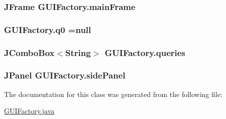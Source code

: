 \subsubsection[{\texorpdfstring{main\+Frame}{mainFrame}}]{\setlength{\rightskip}{0pt plus 5cm}J\+Frame G\+U\+I\+Factory.\+main\+Frame\hspace{0.3cm}{\ttfamily [private]}}\hypertarget{classGUIFactory_afb70d82da7ea373c87a3cb8c2f6eb075}{}\label{classGUIFactory_afb70d82da7ea373c87a3cb8c2f6eb075}
\subsubsection[{\texorpdfstring{q0}{q0}}]{ G\+U\+I\+Factory.\+q0 =null\hspace{0.3cm}{\ttfamily [private]}}\hypertarget{classGUIFactory_a6f1a7d65f7a410b4a47ce24164e1d594}{}\label{classGUIFactory_a6f1a7d65f7a410b4a47ce24164e1d594}
\subsubsection[{\texorpdfstring{queries}{queries}}]{\setlength{\rightskip}{0pt plus 5cm}J\+Combo\+Box$<$String$>$ G\+U\+I\+Factory.\+queries\hspace{0.3cm}{\ttfamily [private]}}\hypertarget{classGUIFactory_a244f5c63e4a280528e2b08316a652287}{}\label{classGUIFactory_a244f5c63e4a280528e2b08316a652287}
\subsubsection[{\texorpdfstring{side\+Panel}{sidePanel}}]{\setlength{\rightskip}{0pt plus 5cm}J\+Panel G\+U\+I\+Factory.\+side\+Panel\hspace{0.3cm}{\ttfamily [private]}}\hypertarget{classGUIFactory_a76d0958fe1b53efd8953c3744fc9db01}{}\label{classGUIFactory_a76d0958fe1b53efd8953c3744fc9db01}


The documentation for this class was generated from the following file\+:\begin{DoxyCompactItemize}
\item 
\hyperlink{GUIFactory_8java}{G\+U\+I\+Factory.\+java}\end{DoxyCompactItemize}
